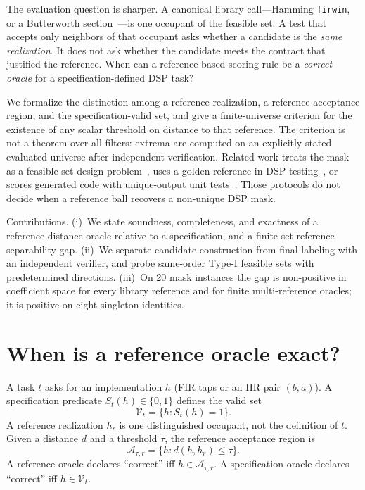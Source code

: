 \documentclass{article}
\begin{document}
The evaluation question is sharper.
A canonical library call---Hamming \texttt{firwin}, or a Butterworth
section~\cite{virtanen2020scipy}---is one occupant of the feasible
set.
A test that accepts only neighbors of that occupant asks whether a
candidate is the \emph{same realization}.
It does not ask whether the candidate meets the contract that
justified the reference.
When can a reference-based scoring rule be a \emph{correct oracle}
for a specification-defined DSP task?

We formalize the distinction among a reference realization, a
reference acceptance region, and the specification-valid set, and
give a finite-universe criterion for the existence of any scalar
threshold on distance to that reference.
The criterion is not a theorem over all filters: extrema are
computed on an explicitly stated evaluated universe after independent
verification.
Related work treats the mask as a feasible-set design
problem~\cite{oppenheim2010dsp,rabiner1975fir,herrmann1973linear},
uses a golden reference in DSP
testing~\cite{huuhtanen2015dsp}, or scores generated code with
unique-output unit tests~\cite{chen2021codex,liu2023evalplus}.
Those protocols do not decide when a reference ball recovers a
non-unique DSP mask.

Contributions.
(i)~We state soundness, completeness, and exactness of a
reference-distance oracle relative to a specification, and a
finite-set reference-separability gap.
(ii)~We separate candidate construction from final labeling with an
independent verifier, and probe same-order Type-I feasible sets with
predetermined directions.
(iii)~On 20 mask instances the gap is non-positive in coefficient
space for every library reference and for finite multi-reference
oracles; it is positive on eight singleton identities.

\section{When is a reference oracle exact?}
\label{sec:theory}

A task $t$ asks for an implementation $h$ (FIR taps or an IIR pair
$(b,a)$).
A specification predicate $S_t(h)\in\{0,1\}$ defines the valid set
\begin{equation}
\mathcal{V}_t=\{h:S_t(h)=1\}.
\label{eq:vt}
\end{equation}
A reference realization $h_r$ is one distinguished occupant, not the
definition of $t$.
Given a distance $d$ and a threshold $\tau$, the reference
acceptance region is
\begin{equation}
\mathcal{A}_{\tau,r}=\{h:d(h,h_r)\le\tau\}.
\label{eq:A}
\end{equation}
A reference oracle declares ``correct'' iff $h\in\mathcal{A}_{\tau,r}$.
A specification oracle declares ``correct'' iff $h\in\mathcal{V}_t$.
\end{document}
